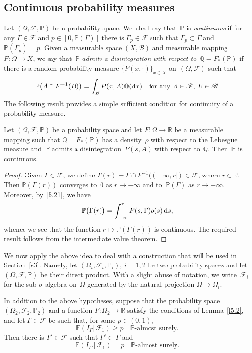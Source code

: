 \documentclass[JEP,XML,SOM,Unicode,ThmDefs]{cedram}
\let\mathcal\mathscr
\theoremstyle{plain}
\numberwithin{equation}{section}
\newcommand{\dd}{{\textup d}}
\newcommand{\Q}{{\mathbb Q}}
\newcommand{\R}{{\mathbb R}}
\newcommand{\IP}{{\mathbb P}}
\newcommand{\E}{{\mathbb E}}
\newcommand{\BB}{{\mathcal B}}
\newcommand{\FF}{{\mathcal F}}
\begin{document}
\subsection{Continuous probability measures}
\label{s5.2}
Let $(\Omega,\FF,\IP)$ be a probability space. We~shall say that~$\IP$ is \emph{continuous} if for any $\Gamma\in\FF$ and $p\in[0,\IP(\Gamma)]$ there is $\Gamma_p\in\FF$ such that $\Gamma_p\subset\Gamma$ and $\IP(\Gamma_p)=p$. Given a measurable space $(X,\BB)$ and measurable mapping $F:\Omega\to X$, we say that~\emph{$\IP$ admits a disintegration with respect to~$\Q=F_*(\IP)$} if there is a random probability measure $\{P(x,\cdot)\}_{x\in X}$ on~$(\Omega,\FF)$ such that
\begin{equation} \label{5.21}
\IP\bigl(A\cap F^{-1}(B)\bigr)=\int_B P(x,A)\Q(\dd x)\quad
\text{for any $A\in\FF$, $B\in\BB$}.
\end{equation}
The following result provides a simple sufficient condition for continuity of a probability measure.

\begin{lemma} \label{l5.2}
Let $(\Omega,\FF,\IP)$ be a probability space and let $F:\Omega\to\R$ be a measurable mapping such that $\Q=F_*(\IP)$ has a density~$\rho$ with respect to the Lebesgue measure and~$\IP$ admits a disintegration~$P(s,A)$ with respect to~$\Q$. Then~$\IP$ is continuous.
\end{lemma}

\begin{proof}
Given $\Gamma\in\FF$, we define $\Gamma(r)=\Gamma\cap F^{-1}((-\infty,r])\in\FF$, where $r\in\R$. Then $\IP(\Gamma(r))$ converges to~$0$ as $r\to-\infty$ and to~$\IP(\Gamma)$ as $r\to+\infty$. Moreover, by~\eqref{5.21}, we have
\[
\IP\bigl(\Gamma(r)\bigr)=\int_{-\infty}^r P(s,\Gamma)\rho(s)\,\dd s,
\]
whence we see that the function $r\mapsto \IP(\Gamma(r))$ is continuous. The required result follows from the intermediate value theorem.
\end{proof}

We now apply the above idea to deal with a construction that will be used in Section~\ref{s3}. Namely, let $(\Omega_i,\FF_i,\IP_i)$, $i=1,2$ be two probability spaces and let $(\Omega,\FF,\IP)$ be their direct product. With a slight abuse of notation, we write~$\FF_i$ for the sub-$\sigma$-algebra on~$\Omega$ generated by the natural projection $\Omega\to\Omega_i$.

\begin{lemma} \label{l5.3}
In addition to the above hypotheses, suppose that the probability space $(\Omega_2,\FF_2,\IP_2)$ and a function $F:\Omega_2\to\R$ satisfy the conditions of Lemma~\ref{l5.2}, and let $\Gamma\in\FF$ be such that, for some $p\in(0,1)$,
\begin{equation} \label{5.22}
\E(I_\Gamma|\,\FF_1)\ge p\quad\text{$\IP$-almost surely}.
\end{equation}
Then there is $\Gamma'\in\FF$ such that $\Gamma'\subset\Gamma$ and
\begin{equation} \label{5.23}
\E(I_{\Gamma'}|\,\FF_1)= p\quad\text{$\IP$-almost surely}.
\end{equation}
\end{lemma}
\end{document}
